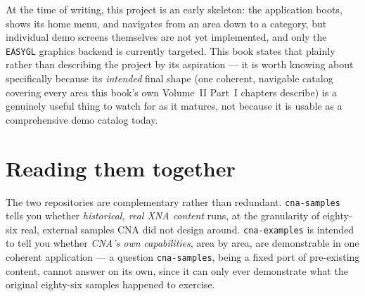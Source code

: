 At the time of writing, this project is an early skeleton: the application boots, shows its
home menu, and navigates from an area down to a category, but individual demo screens
themselves are not yet implemented, and only the \texttt{EASYGL} graphics backend is
currently targeted. This book states that plainly rather than describing the project by its
aspiration --- it is worth knowing about specifically because its \emph{intended} final shape
(one coherent, navigable catalog covering every area this book's own Volume~II Part~I
chapters describe) is a genuinely useful thing to watch for as it matures, not because it is
usable as a comprehensive demo catalog today.

\section{Reading them together}

The two repositories are complementary rather than redundant. \texttt{cna-samples} tells you
whether \emph{historical, real XNA content} runs, at the granularity of eighty-six real,
external samples CNA did not design around. \texttt{cna-examples} is intended to tell you
whether \emph{CNA's own capabilities}, area by area, are demonstrable in one coherent
application --- a question \texttt{cna-samples}, being a fixed port of pre-existing content,
cannot answer on its own, since it can only ever demonstrate what the original eighty-six
samples happened to exercise.

